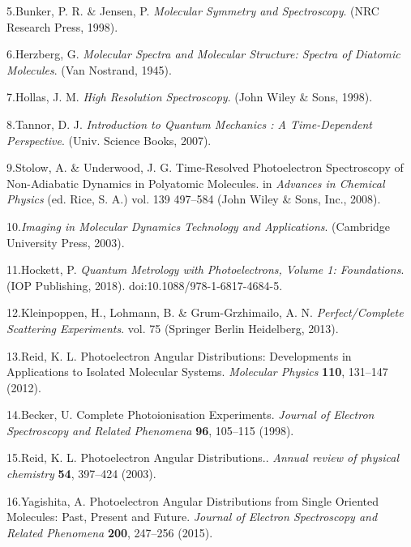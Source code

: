 \documentclass[10pt]{article}
\begin{document}
\label{csl:5}5.Bunker, P. R. \& Jensen, P. \textit{{Molecular {{Symmetry}} and {{Spectroscopy}}}}. ({NRC Research Press}, 1998).

\label{csl:6}6.Herzberg, G. \textit{{Molecular {{Spectra}} and {{Molecular Structure}}: {{Spectra}} of Diatomic Molecules}}. ({Van Nostrand}, 1945).

\label{csl:7}7.Hollas, J. M. \textit{{High {{Resolution Spectroscopy}}}}. ({John Wiley \& Sons}, 1998).

\label{csl:8}8.Tannor, D. J. \textit{{Introduction to Quantum Mechanics : A Time-Dependent Perspective}}. ({Univ. Science Books}, 2007).

\label{csl:9}9.Stolow, A. \& Underwood, J. G. {Time-{{Resolved Photoelectron Spectroscopy}} of {{Non}}-{{Adiabatic Dynamics}} in {{Polyatomic Molecules}}}. in \textit{Advances in {{Chemical Physics}}} (ed. Rice, S. A.) vol. 139 497–584 ({John Wiley \& Sons, Inc.}, 2008).

\label{csl:10}10.\textit{{Imaging in {{Molecular Dynamics Technology}} and {{Applications}}}}. ({Cambridge University Press}, 2003).

\label{csl:11}11.Hockett, P. \textit{{Quantum {{Metrology}} with {{Photoelectrons}}, {{Volume}} 1: {{Foundations}}}}. ({IOP Publishing}, 2018). doi:10.1088/978-1-6817-4684-5.

\label{csl:12}12.Kleinpoppen, H., Lohmann, B. \& {Grum-Grzhimailo}, A. N. \textit{{Perfect/{{Complete Scattering Experiments}}}}. vol. 75 ({Springer Berlin Heidelberg}, 2013).

\label{csl:13}13.Reid, K. L. {Photoelectron Angular Distributions: Developments in Applications to Isolated Molecular Systems}. \textit{Molecular Physics} \textbf{110}, 131–147 (2012).

\label{csl:14}14.Becker, U. {Complete Photoionisation Experiments}. \textit{Journal of Electron Spectroscopy and Related Phenomena} \textbf{96}, 105–115 (1998).

\label{csl:15}15.Reid, K. L. {Photoelectron Angular Distributions.}. \textit{Annual review of physical chemistry} \textbf{54}, 397–424 (2003).

\label{csl:16}16.Yagishita, A. {Photoelectron Angular Distributions from Single Oriented Molecules: {{Past}}, Present and Future}. \textit{Journal of Electron Spectroscopy and Related Phenomena} \textbf{200}, 247–256 (2015).
\end{document}
